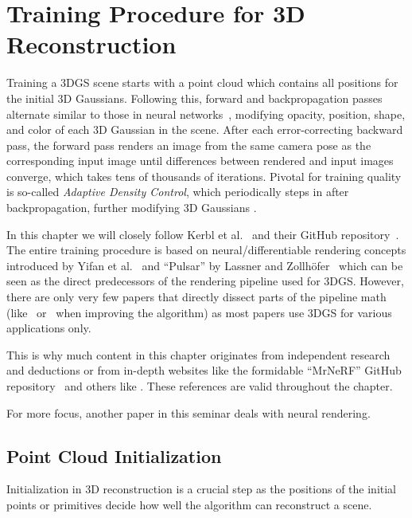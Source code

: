 \vspace{-5pt}
\section{Training Procedure for 3D Reconstruction}
Training a 3DGS scene starts with a point cloud which contains all positions for the initial 3D Gaussians. Following this, forward and backpropagation passes alternate similar to those in neural networks~\cite{thimm2025ML}, modifying opacity, position, shape, and color of each 3D Gaussian in the scene.
After each error-correcting backward pass, the forward pass renders an image from the same camera pose as the corresponding input image until differences between rendered and input images converge, which takes tens of thousands of iterations. Pivotal for training quality is so-called \textit{Adaptive Density Control}, which periodically steps in after backpropagation, further modifying 3D Gaussians \cite{kerbl3DGaussianSplatting2023}.

In this chapter we will closely follow Kerbl et al.~\cite{kerbl3DGaussianSplatting2023} and their GitHub repository~\cite{kerblRepo}. The entire training procedure is based on neural/differentiable rendering concepts introduced by Yifan et al.~\cite{yifanDifferentiableSurfaceSplatting2019} and ``Pulsar'' by Lassner and Zollhöfer~\cite{lassnerPulsarEfficientSpherebased2021} which can be seen as the direct predecessors of the rendering pipeline used for 3DGS.
However, there are only very few papers that directly dissect parts of the pipeline math (like~\cite{huang2DGaussianSplatting2024} or~\cite{yuMipSplattingAliasFree3D2024} when improving the algorithm) as most papers use 3DGS for various applications only.

This is why much content in this chapter originates from independent research and deductions or from in-depth websites like the formidable ``MrNeRF'' GitHub repository~\cite{githubMrNerf} and others like \cite{ComprehensiveStudyGaussian2025, matuszczykRendering3DGaussian2024, yurkovaComprehensiveOverviewGaussian2023}. These references are valid throughout the chapter.

For more focus, another paper in this seminar deals with neural rendering.

\subsection{Point Cloud Initialization}
\label{ch:init}
Initialization in 3D reconstruction is a crucial step as the positions of the initial points or primitives decide how well the algorithm can reconstruct a scene.

